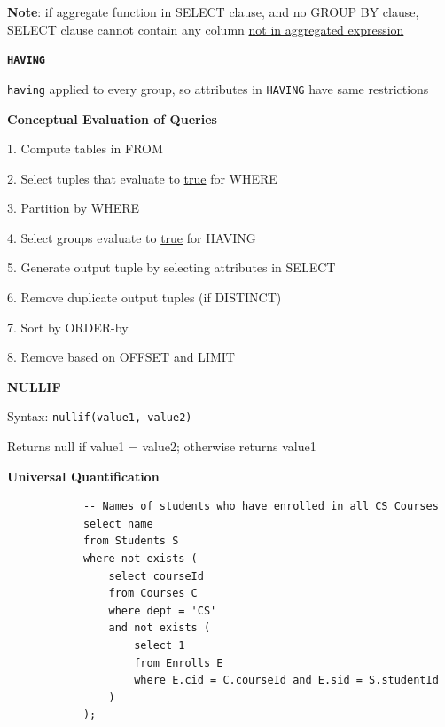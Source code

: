 \documentclass[10pt, a4paper]{article}
\newcommand{\highlight}[1]{{\color{red}\textbf{#1}}}
\newcommand{\red}[1]{{\color{red}#1}}
\begin{document}
\begin{multicols*}{3}
		\highlight{Note}: if aggregate function in SELECT clause, and \red{no} GROUP BY clause, SELECT clause \red{cannot} contain any column \underline{not in aggregated expression}

		{\bf \texttt{HAVING}}

		\texttt{having} applied to every \red{group}, so attributes in \texttt{HAVING} have same restrictions

		\textbf{Conceptual Evaluation of Queries}

		1. Compute tables in FROM

		2. Select tuples that evaluate to \underline{true} for WHERE

		3. Partition by WHERE

		4. Select groups evaluate to \underline{true} for HAVING

		5. Generate output tuple by selecting attributes in SELECT

		6. Remove duplicate output tuples (if DISTINCT)

		7. Sort by ORDER-by

		8. Remove based on OFFSET and LIMIT



		\textbf{NULLIF}

		Syntax: \texttt{nullif(value1, value2)}

		Returns null if value1 = value2; otherwise returns value1

		\textbf{Universal Quantification}
		\begin{verbatim}
			-- Names of students who have enrolled in all CS Courses
			select name
			from Students S
			where not exists (
			    select courseId
			    from Courses C
			    where dept = 'CS'
			    and not exists (
			        select 1
			        from Enrolls E
			        where E.cid = C.courseId and E.sid = S.studentId
			    )
			);
		\end{verbatim}


\end{multicols*}
\end{document}
